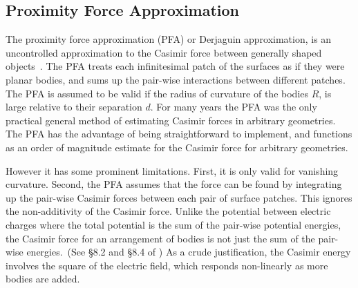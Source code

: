 \subsection{Proximity Force Approximation}

The proximity force approximation (PFA) or Derjaguin approximation, is an uncontrolled approximation to
the Casimir force between generally shaped objects~\cite{Derjaguin1934,Blocki1977}.  
The PFA treats each infinitesimal patch of the surfaces as if they were planar bodies,
and sums up the pair-wise interactions between different patches.
The PFA is assumed to be valid if the radius of curvature of the bodies $R$, is large relative to 
their separation $d$.  
For many years the PFA was the only practical general method of estimating Casimir forces in arbitrary geometries.
The PFA has the advantage of being straightforward to implement, and functions as an order of magnitude
estimate for the Casimir force for arbitrary geometries.

However it has some prominent limitations. First, it is only valid for vanishing curvature.
Second, the PFA assumes that the force can be found by integrating up
the pair-wise Casimir forces between each pair of surface patches.  This ignores the non-additivity
of the Casimir force.  Unlike the potential between electric charges where the total potential is
the sum of the pair-wise potential energies, the Casimir force for an arrangement
of bodies is not just the sum of the pair-wise energies.~(See \S{8.2} and \S{8.4} of \cite{Milonni1994})
As a crude justification, the Casimir energy involves the square of the electric field, which responds 
non-linearly as more bodies are added.  

